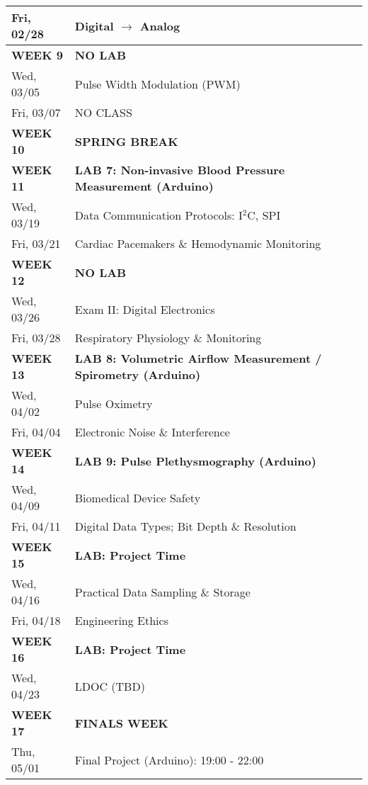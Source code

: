 \begin{tabular}{|l|l|}
Fri, 02/28  &   Digital $\rightarrow$ Analog \\ \hline
{\bf WEEK 9}      &   {\bf NO LAB} \\
Wed, 03/05  &   Pulse Width Modulation (PWM) \\ 
Fri, 03/07  &   NO CLASS \\ \hline
{\bf WEEK 10}     &   {\bf SPRING BREAK} \\ \hline
{\bf WEEK 11}     &   {\bf LAB 7: Non-invasive Blood Pressure Measurement (Arduino)} \\
Wed, 03/19  &   Data Communication Protocols: I$^2$C, SPI\\
Fri, 03/21  &   Cardiac Pacemakers \& Hemodynamic Monitoring \\ \hline
{\bf WEEK 12}     &   {\bf NO LAB} \\
Wed, 03/26  &   Exam II: Digital Electronics \\ 
Fri, 03/28  &   Respiratory Physiology \& Monitoring \\  \hline
{\bf WEEK 13}     &   {\bf LAB 8: Volumetric Airflow Measurement / Spirometry (Arduino)} \\
Wed, 04/02  &   Pulse Oximetry \\ 
Fri, 04/04  &   Electronic Noise \& Interference \\ \hline
{\bf WEEK 14}     &   {\bf LAB 9: Pulse Plethysmography (Arduino)} \\
Wed, 04/09  &   Biomedical Device Safety \\
Fri, 04/11  &   Digital Data Types; Bit Depth \& Resolution \\ \hline
{\bf WEEK 15}     &   {\bf LAB: Project Time} \\
Wed, 04/16  &   Practical Data Sampling \& Storage \\
Fri, 04/18  &   Engineering Ethics \\ \hline
{\bf WEEK 16}     &   {\bf LAB: Project Time} \\
Wed, 04/23  &   LDOC (TBD) \\ \hline
{\bf WEEK 17}     &   {\bf FINALS WEEK} \\
Thu, 05/01  &   Final Project (Arduino): 19:00 - 22:00 \\ \hline
\end{tabular}
